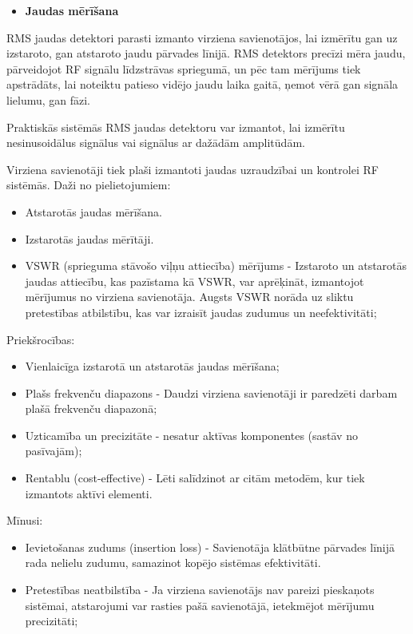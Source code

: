 \begin{itemize}
    \item \textbf{Jaudas mērīšana}
\end{itemize}

RMS jaudas detektori parasti izmanto virziena savienotājos, lai izmērītu gan uz izstaroto, gan atstaroto jaudu pārvades līnijā. RMS detektors precīzi mēra jaudu, pārveidojot RF signālu līdzstrāvas spriegumā, un pēc tam mērījums tiek apstrādāts, lai noteiktu patieso vidējo jaudu laika gaitā, ņemot vērā gan signāla lielumu, gan fāzi.

Praktiskās sistēmās RMS jaudas detektoru var izmantot, lai izmērītu nesinusoidālus signālus vai signālus ar dažādām amplitūdām.

Virziena savienotāji tiek plaši izmantoti jaudas uzraudzībai un kontrolei RF sistēmās. Daži no pielietojumiem:
\begin{itemize}
    \item Atstarotās jaudas mērīšana.
    \item Izstarotās jaudas mērītāji.
    \item VSWR (sprieguma stāvošo viļņu attiecība) mērījums - Izstaroto un atstarotās jaudas attiecību, kas pazīstama kā VSWR, var aprēķināt, izmantojot mērījumus no virziena savienotāja. Augsts VSWR norāda uz sliktu pretestības atbilstību, kas var izraisīt jaudas zudumus un neefektivitāti;
\end{itemize}

Priekšrocības:
\begin{itemize}
    \item Vienlaicīga izstarotā un atstarotās jaudas mērīšana;
    \item Plašs frekvenču diapazons - Daudzi virziena savienotāji ir paredzēti darbam plašā frekvenču diapazonā;
    \item Uzticamība un precizitāte - nesatur aktīvas komponentes (sastāv no pasīvajām);
    \item Rentablu (cost-effective) - Lēti salīdzinot ar citām metodēm, kur tiek izmantots aktīvi elementi.
\end{itemize}
Mīnusi:
\begin{itemize}
    \item Ievietošanas zudums (insertion loss) - Savienotāja klātbūtne pārvades līnijā rada nelielu zudumu, samazinot kopējo sistēmas efektivitāti.
    \item Pretestības neatbilstība - Ja virziena savienotājs nav pareizi pieskaņots sistēmai, atstarojumi var rasties pašā savienotājā, ietekmējot mērījumu precizitāti;
\end{itemize}

